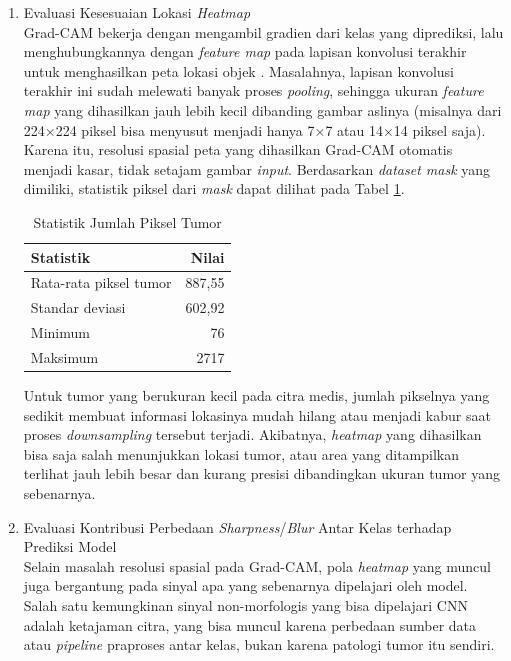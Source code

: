 \begin{enumerate}
	\item Evaluasi Kesesuaian Lokasi \textit{Heatmap} \\
	Grad-CAM bekerja dengan mengambil gradien dari kelas yang diprediksi, lalu menghubungkannya dengan \textit{feature map} pada lapisan konvolusi terakhir untuk menghasilkan peta lokasi objek \textcite{selvaraju2020gradcam}. Masalahnya, lapisan konvolusi terakhir ini sudah melewati banyak proses \textit{pooling}, sehingga ukuran \textit{feature map} yang dihasilkan jauh lebih kecil dibanding gambar aslinya (misalnya dari 224×224 piksel bisa menyusut menjadi hanya 7×7 atau 14×14 piksel saja). Karena itu, resolusi spasial peta yang dihasilkan Grad-CAM otomatis menjadi kasar, tidak setajam gambar \textit{input}. Berdasarkan \textit{dataset mask} yang dimiliki, statistik piksel dari \textit{mask} dapat dilihat pada Tabel \ref{tab:statistik_piksel_tumor}.
	
	\begin{table}[htbp]
		\centering
		\caption{Statistik Jumlah Piksel Tumor}
		\label{tab:statistik_piksel_tumor}
		\begin{tabular}{|l|r|}
			\hline
			\textbf{Statistik} & \textbf{Nilai} \\ \hline
			Rata-rata piksel tumor & 887{,}55 \\ \hline
			Standar deviasi        & 602{,}92 \\ \hline
			Minimum                & 76 \\ \hline
			Maksimum                & 2717 \\ \hline
		\end{tabular}
	\end{table}
	
	Untuk tumor yang berukuran kecil pada citra medis, jumlah pikselnya yang sedikit membuat informasi lokasinya mudah hilang atau menjadi kabur saat proses \textit{downsampling} tersebut terjadi. Akibatnya, \textit{heatmap} yang dihasilkan bisa saja salah menunjukkan lokasi tumor, atau area yang ditampilkan terlihat jauh lebih besar dan kurang presisi dibandingkan ukuran tumor yang sebenarnya.
	
	\item Evaluasi Kontribusi Perbedaan \textit{Sharpness}/\textit{Blur} Antar Kelas terhadap Prediksi Model \\
	Selain masalah resolusi spasial pada Grad-CAM, pola \textit{heatmap} yang muncul juga bergantung pada sinyal apa yang sebenarnya dipelajari oleh model. Salah satu kemungkinan sinyal non-morfologis yang bisa dipelajari CNN adalah ketajaman citra, yang bisa muncul karena perbedaan sumber data atau \textit{pipeline} praproses antar kelas, bukan karena patologi tumor itu sendiri.
	

\end{enumerate}
